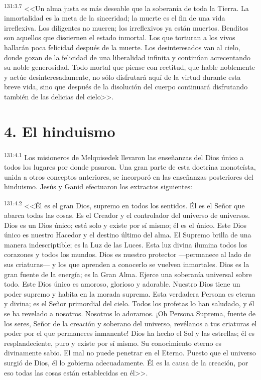 \par 
\textsuperscript{131:3.7} <<Un alma justa es más deseable que la soberanía de toda la Tierra. La inmortalidad es la meta de la sinceridad; la muerte es el fin de una vida irreflexiva. Los diligentes no mueren; los irreflexivos ya están muertos. Benditos son aquellos que disciernen el estado inmortal. Los que torturan a los vivos hallarán poca felicidad después de la muerte. Los desinteresados van al cielo, donde gozan de la felicidad de una liberalidad infinita y continúan acrecentando su noble generosidad. Todo mortal que piense con rectitud, que hable noblemente y actúe desinteresadamente, no sólo disfrutará aquí de la virtud durante esta breve vida, sino que después de la disolución del cuerpo continuará disfrutando también de las delicias del cielo>>.

\section*{4. El hinduismo}
\par 
\textsuperscript{131:4.1} Los misioneros de Melquisedek llevaron las enseñanzas del Dios único a todos los lugares por donde pasaron. Una gran parte de esta doctrina monoteísta, unida a otros conceptos anteriores, se incorporó en las enseñanzas posteriores del hinduismo. Jesús y Ganid efectuaron los extractos siguientes:

\par 
\textsuperscript{131:4.2} <<Él es el gran Dios, supremo en todos los sentidos. Él es el Señor que abarca todas las cosas. Es el Creador y el controlador del universo de universos. Dios es un Dios único; está solo y existe por sí mismo; él es el único. Este Dios único es nuestro Hacedor y el destino último del alma. El Supremo brilla de una manera indescriptible; es la Luz de las Luces. Esta luz divina ilumina todos los corazones y todos los mundos. Dios es nuestro protector ---permanece al lado de sus criaturas--- y los que aprenden a conocerlo se vuelven inmortales. Dios es la gran fuente de la energía; es la Gran Alma. Ejerce una soberanía universal sobre todo. Este Dios único es amoroso, glorioso y adorable. Nuestro Dios tiene un poder supremo y habita en la morada suprema. Esta verdadera Persona es eterna y divina; es el Señor primordial del cielo. Todos los profetas lo han saludado, y él se ha revelado a nosotros. Nosotros lo adoramos. ¡Oh Persona Suprema, fuente de los seres, Señor de la creación y soberano del universo, revélanos a tus criaturas el poder por el que permaneces inmanente! Dios ha hecho el Sol y las estrellas; él es resplandeciente, puro y existe por sí mismo. Su conocimiento eterno es divinamente sabio. El mal no puede penetrar en el Eterno. Puesto que el universo surgió de Dios, él lo gobierna adecuadamente. Él es la causa de la creación, por eso todas las cosas están establecidas en él>>.

